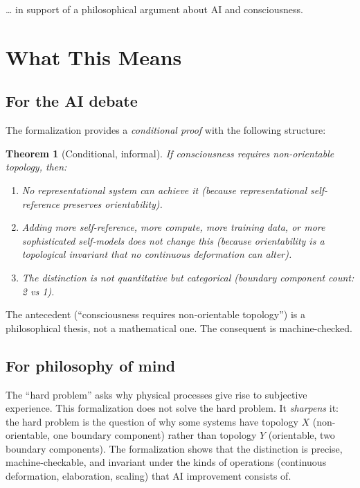 \documentclass[11pt]{article}
\newtheorem{theorem}{Theorem}
\begin{document}
\noindent
\ldots{} in support of a philosophical argument about AI and consciousness.

\section{What This Means}

\subsection{For the AI debate}

The formalization provides a \emph{conditional proof} with the following structure:

\begin{theorem}[Conditional, informal]
If consciousness requires non-orientable topology, then:
\begin{enumerate}
\item No representational system can achieve it (because representational
  self-reference preserves orientability).
\item Adding more self-reference, more compute, more training data, or more
  sophisticated self-models does not change this (because orientability is a
  topological invariant that no continuous deformation can alter).
\item The distinction is not quantitative but categorical (boundary component
  count: 2 vs 1).
\end{enumerate}
\end{theorem}

The antecedent (``consciousness requires non-orientable topology'') is a
philosophical thesis, not a mathematical one. The consequent is machine-checked.

\subsection{For philosophy of mind}

The ``hard problem'' asks why physical processes give rise to subjective
experience. This formalization does not solve the hard problem. It \emph{sharpens}
it: the hard problem is the question of why some systems have topology $X$
(non-orientable, one boundary component) rather than topology $Y$ (orientable,
two boundary components). The formalization shows that the distinction is
precise, machine-checkable, and invariant under the kinds of operations
(continuous deformation, elaboration, scaling) that AI improvement consists of.
\end{document}
